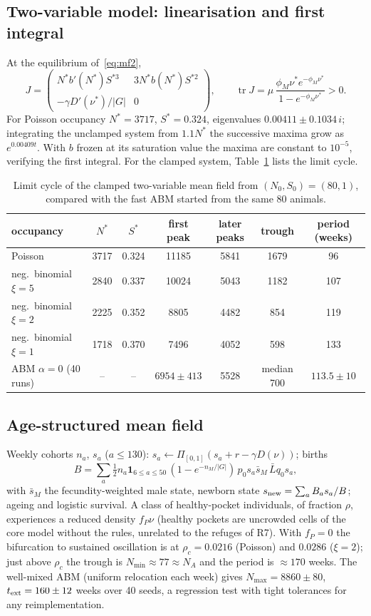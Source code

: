 \subsection{Two-variable model: linearisation and first integral}
\label{app:ode}

At the equilibrium of~\eqref{eq:mf2},
\[
J=\begin{pmatrix} N^*b'(N^*)S^{*3} & 3N^*b(N^*)S^{*2}\\[2pt]
-\gamma D'(\nu^*)/|G| & 0\end{pmatrix},\qquad
\operatorname{tr}J=\mu\,\frac{\phi_M\nu^*e^{-\phi_M\nu^*}}{1-e^{-\phi_M\nu^*}}>0 .
\]
For Poisson occupancy $N^*=3717$, $S^*=0.324$, eigenvalues
$0.00411\pm0.1034\,i$; integrating the unclamped system from $1.1N^*$ the
successive maxima grow as $e^{0.00409t}$. With $b$ frozen at its saturation
value the maxima are constant to $10^{-5}$, verifying the first integral.
For the clamped system, Table~\ref{tab:ode} lists the limit cycle.

\begin{table}[h]
\centering\small
\begin{tabular}{lcccccc}
\toprule
occupancy & $N^*$ & $S^*$ & first peak & later peaks & trough & period (weeks)\\
\midrule
Poisson & 3717 & 0.324 & 11185 & 5841 & 1679 & 96\\
neg.\ binomial $\xi=5$ & 2840 & 0.337 & 10024 & 5043 & 1182 & 107\\
neg.\ binomial $\xi=2$ & 2225 & 0.352 & 8805 & 4482 & 854 & 119\\
neg.\ binomial $\xi=1$ & 1718 & 0.370 & 7496 & 4052 & 598 & 133\\
ABM $\alpha=0$ (40 runs) & -- & -- & $6954\pm413$ & 5528 & median 700 & $113.5\pm10$\\
\bottomrule
\end{tabular}
\caption{Limit cycle of the clamped two-variable mean field from
$(N_0,S_0)=(80,1)$, compared with the fast ABM
started from the same 80 animals.}
\label{tab:ode}
\end{table}

\subsection{Age-structured mean field}
\label{app:age}

Weekly cohorts $n_a$, $s_a$ ($a\le130$): $s_a\leftarrow\Pi_{[0,1]}(s_a+r-\gamma
D(\nu))$; births
\[
B=\sum_a \tfrac12 n_a\mathbf 1_{6\le a\le 50}\,(1-e^{-n_M/|G|})\,p_0 s_a\bar s_M\,\bar Lq_0 s_a,
\]
with $\bar s_M$ the fecundity-weighted male state, newborn state $s_{\rm new}=\sum_a B_a s_a/B$;
ageing and logistic survival. A class of healthy-pocket individuals, of fraction
$\rho$, experiences a reduced density $f_P\nu$ (healthy pockets are uncrowded cells of
the core model without the rules, unrelated to the refuges of R7). With $f_P=0$ the bifurcation to sustained
oscillation is at $\rho_c=0.0216$ (Poisson) and $0.0286$ ($\xi=2$); just
above $\rho_c$ the trough is $N_{\min}\approx77\approx N_A$ and the period is
$\approx170$ weeks. The well-mixed ABM (uniform relocation each week) gives
$N_{\max}=8860\pm80$, $t_{\rm ext}=160\pm12$ weeks over 40 seeds, a
regression test with tight tolerances for any reimplementation.

